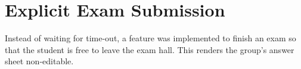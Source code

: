 \section{Explicit Exam Submission}
Instead of waiting for time-out, a feature was implemented to finish an exam so that the student is free to leave the exam hall. This renders the group's answer sheet non-editable.